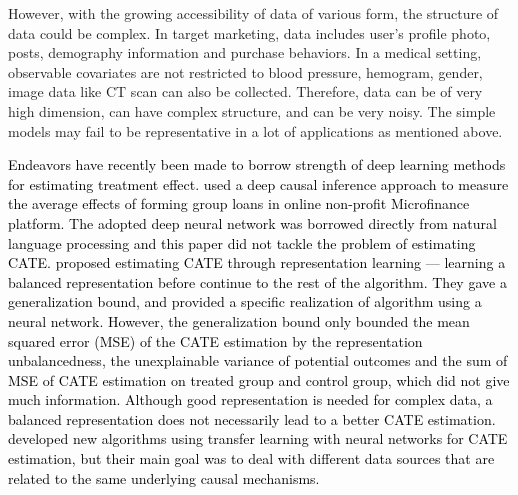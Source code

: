 \documentclass[11pt,paper=letter]{scrartcl}
\newcommand\hz[1]{\textcolor{black}{#1}}
\begin{document}
However, with the growing accessibility of data of various form, the structure of data could be complex. In target marketing, data includes user's profile photo, posts, demography information and purchase behaviors. In a medical setting, observable covariates are not restricted to blood pressure, hemogram, gender, image data like CT scan can also be collected. Therefore, data can be of very high dimension, can have complex structure, and can be very noisy. The simple models may fail to be representative in a lot of applications as mentioned above. 

\hz{Endeavors have recently been made to borrow strength of deep learning methods for estimating treatment effect. \cite{pham2017deepcausal} used a deep causal inference approach to measure the average effects of forming group loans in online non-profit Microfinance platform. The adopted deep neural network was borrowed directly from natural language processing and this paper did not tackle the problem of estimating CATE. \cite{shalit2016} proposed estimating CATE through representation learning --- learning a balanced representation before continue to the rest of the algorithm. They gave a generalization bound, and provided a specific realization of algorithm using a neural network. However, the generalization bound only bounded the mean squared error (MSE) of the CATE estimation by the representation unbalancedness, the unexplainable variance of potential outcomes and the sum of MSE of CATE estimation on treated group and control group, which did not give much information. Although good representation is needed for complex data, a balanced representation does not necessarily lead to a better CATE estimation. \cite{kunzel2018transfer} developed new algorithms using transfer learning with neural networks for CATE estimation, but their main goal was to deal with different data sources that are related to the same underlying causal mechanisms.}

\end{document}
